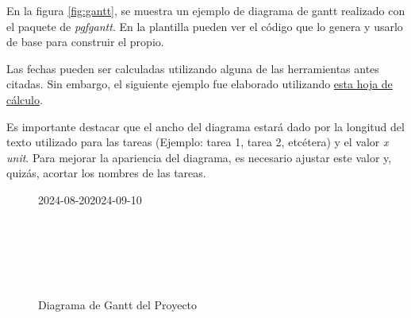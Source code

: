 En la figura \ref{fig:gantt}, se muestra un ejemplo de diagrama de gantt
realizado con el paquete de \textit{pgfgantt}. En la plantilla pueden ver el
código que lo genera y usarlo de base para construir el propio.

Las fechas pueden ser calculadas utilizando alguna de las herramientas antes
citadas. Sin embargo, el siguiente ejemplo fue elaborado utilizando
\href{https://docs.google.com/spreadsheets/d/1fBz8NhSpc4tkkhz3KjJCbh1nR_ltDkfEcZi4tZXduqs}{esta
	hoja de cálculo}.

Es importante destacar que el ancho del diagrama estará dado por la longitud
del texto utilizado para las tareas (Ejemplo: tarea 1, tarea 2, etcétera) y el
valor \textit{x unit}. Para mejorar la apariencia del diagrama, es necesario
ajustar este valor y, quizás, acortar los nombres de las tareas.

\begin{landscape}
	\begin{figure}[htpb]
		\begin{center}
			\begin{ganttchart}[
					time slot unit=day,
					time slot format=isodate,
					x unit=0.5cm, %
					y unit title=0.7cm, %
					y unit chart=0.7cm, %
					milestone/.append style={xscale=4},
					vgrid,
					hgrid,
				]{2024-08-20}{2024-09-10}
				 \\
				 \\
				 \\

				 \\
				 \\
				 \\
			\end{ganttchart}
		\end{center}
		\caption{Diagrama de Gantt del Proyecto}
		\label{fig:gantt1}
	\end{figure}
\end{landscape}

